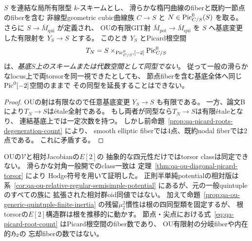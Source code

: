 \begin{corollary}[節点退化へのOU有限射とPicard根空間の同一視は不可能]
\label{cor:qa-ou-nodal-compactification-obstruction}
$S$ を連結な局所有限型 $k$-スキームとし、
滑らかな楕円曲線のfiberと既約一節点のfiberを含む
非線型geometric cubic曲線族 $C\to S$ と
$N\in\operatorname{Pic}^0_{C/S}(S)$ を取る。
さらに $S\to\overline M_{\mathrm{qui}}$ が定義され、
OUの有限GIT射
$\overline M_{\mathrm{pot}}\to\overline M_{\mathrm{qui}}$
を $S$ へ基底変更した有限射を $Y_S\to S$ とする。
このとき $Y_S$ とPicard根空間
\[
 T_N=S\times_{\operatorname{Pic}^0_{C/S},[-2]}\operatorname{Pic}^0_{C/S}
\]
は、\emph{基底$S$上のスキームまたは代数空間として同型でない}。
従って一般の滑らかなlocus上で両torsorを同一視できたとしても、
節点fiberを含む基底全体へ同じ$\operatorname{Pic}^0[-2]$空間のままで
その同型を延長することはできない。
\end{corollary}
\begin{proof}
OUの射は有限なので任意基底変更 $Y_S\to S$ も有限である。
一方、論文B \cite[\texttt{lem:picard-halves}]{QuadricModuli2026}
により$T_N\to S$はétale全射である。
もし両者が同型なら$T_N\to S$は有限étaleとなり、
連結基底上では一定次数を持つ。
しかし前命題~\ref{prop:qa-picard-roots-degeneration-count} により、
smooth elliptic fiberでは4点、既約nodal fiberでは2点である。
これに矛盾する。
\end{proof}

\begin{remark}[有限被覆のtorsorと慣性の別々の比較]
\label{rem:qa-ou-picard-fourfold-not-identical}
OUの$\mathcal V$と相対Jacobianの$E[2]$の
抽象的な四元性だけではtorsor classは同定できない。
滑らかな対角一般開でのclass一致は
定理~\ref{thm:qa-ou-diagonal-picard-torsor} により
Hodge符号を用いて証明した。
正則半単純potentialの相対版は
系~\ref{cor:qa-ou-relative-regular-semisimple-potential}
にあるが、元の一般quintupleのすべての族に
拡張された相対群oid同値ではない。
加えて命題~\ref{prop:qa-ou-generic-quintuple-finite-inertia}
の残留$\mu_2^2$慣性は根の四同型類を固定するが、
根torsorの$E[2]$構造群は根を推移的に動かす。
節点・尖点における式~\eqref{eq:qa-picard-root-count}
はPicard根空間のfiber数であり、
OU有限射の分岐fiberや内在的$\mathfrak H_2$の
忘却fiberの数ではない。
\end{remark}

